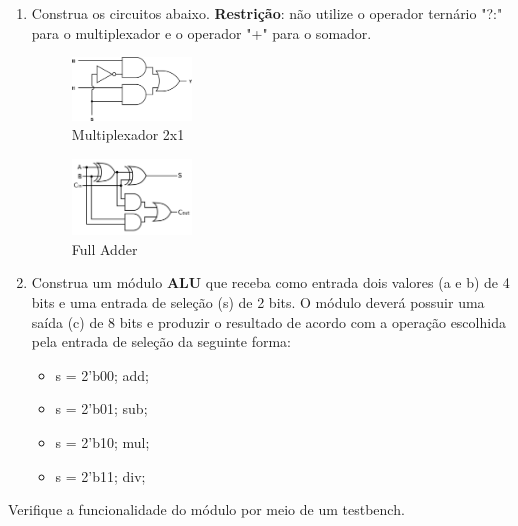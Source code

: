 \documentclass[a4paper]{article}
\begin{document}
\begin{enumerate}
\item Construa os circuitos abaixo. \textbf{Restrição}: não utilize o operador ternário "?:" para o multiplexador e o operador "+" para o somador.
	\begin{figure}[H]
	\centering
	\includegraphics[width=0.3\textwidth]{images/mux2x1.jpg}
    \caption*{Multiplexador 2x1}
	\end{figure}
    
    \begin{figure}[!h]
	\centering
	\includegraphics[width=0.3\textwidth]{images/fulladder.jpg}
    \caption*{Full Adder}
	\end{figure}
		
\item Construa um módulo \textbf{ALU} que receba como entrada dois valores (a e b) de 4 bits e uma entrada de seleção (s) de 2 bits. O módulo deverá possuir uma saída (c) de 8 bits e produzir o resultado de acordo com a operação escolhida pela entrada de seleção da seguinte forma:
	\begin{itemize}
		\item s = 2'b00; add;
		\item s = 2'b01; sub;
		\item s = 2'b10; mul;
		\item s = 2'b11; div;
	\end{itemize}
\end{enumerate}

Verifique a funcionalidade do módulo por meio de um testbench.
\end{document}
